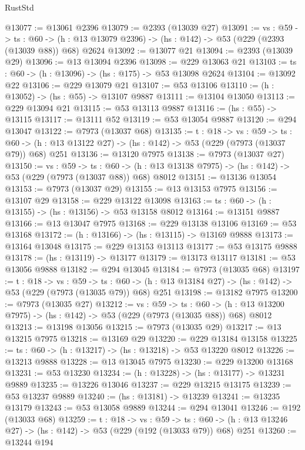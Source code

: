 \begin{lexlean}{RustStd}
\begin{coremodule}
@13077 := @13061 @2396
@13079 := @2393 (@13039 @27)
@13091 := {vs : @59} ->
  {ts : @60} -> (h : @13 @13079 @2396) -> (hs : @142) -> @53 (@229 (@2393 (@13039 @88)) @68) @2624
@13092 := @13077 @21
@13094 := @2393 (@13039 @29)
@13096 := @13 @13094 @2396
@13098 := @229 @13063 @21
@13103 := {ts : @60} -> (h : @13096) -> (hs : @175) -> @53 @13098 @2624
@13104 := @13092 @22
@13106 := @229 @13079 @21
@13107 := @53 @13106
@13110 := (h : @13052) -> (hs : @55) -> @13107 @9887
@13111 := @13104 @13050
@13113 := @229 @13094 @21
@13115 := @53 @13113 @9887
@13116 := (hs : @55) -> @13115
@13117 := @13111 @52
@13119 := @53 @13054 @9887
@13120 := @294 @13047
@13122 := @7973 (@13037 @68)
@13135 := {t : @18} ->
  {vs : @59} ->
  {ts : @60} -> (h : @13 @13122 @27) -> (hs : @142) -> @53 (@229 (@7973 (@13037 @79)) @68) @251
@13136 := @13120 @7975
@13138 := @7973 (@13037 @27)
@13150 := {vs : @59} ->
  {ts : @60} -> (h : @13 @13138 @7975) -> (hs : @142) -> @53 (@229 (@7973 (@13037 @88)) @68) @8012
@13151 := @13136 @13054
@13153 := @7973 (@13037 @29)
@13155 := @13 @13153 @7975
@13156 := @13107 @29
@13158 := @229 @13122 @13098
@13163 := {ts : @60} -> (h : @13155) -> (hs : @13156) -> @53 @13158 @8012
@13164 := @13151 @9887
@13166 := @13 @13047 @7975
@13168 := @229 @13138 @13106
@13169 := @53 @13168
@13172 := (h : @13166) -> (hs : @13115) -> @13169 @9888
@13173 := @13164 @13048
@13175 := @229 @13153 @13113
@13177 := @53 @13175 @9888
@13178 := (hs : @13119) -> @13177
@13179 := @13173 @13117
@13181 := @53 @13056 @9888
@13182 := @294 @13045
@13184 := @7973 (@13035 @68)
@13197 := {t : @18} ->
  {vs : @59} ->
  {ts : @60} -> (h : @13 @13184 @27) -> (hs : @142) -> @53 (@229 (@7973 (@13035 @79)) @68) @251
@13198 := @13182 @7975
@13200 := @7973 (@13035 @27)
@13212 := {vs : @59} ->
  {ts : @60} -> (h : @13 @13200 @7975) -> (hs : @142) -> @53 (@229 (@7973 (@13035 @88)) @68) @8012
@13213 := @13198 @13056
@13215 := @7973 (@13035 @29)
@13217 := @13 @13215 @7975
@13218 := @13169 @29
@13220 := @229 @13184 @13158
@13225 := {ts : @60} -> (h : @13217) -> (hs : @13218) -> @53 @13220 @8012
@13226 := @13213 @9888
@13228 := @13 @13045 @7975
@13230 := @229 @13200 @13168
@13231 := @53 @13230
@13234 := (h : @13228) -> (hs : @13177) -> @13231 @9889
@13235 := @13226 @13046
@13237 := @229 @13215 @13175
@13239 := @53 @13237 @9889
@13240 := (hs : @13181) -> @13239
@13241 := @13235 @13179
@13243 := @53 @13058 @9889
@13244 := @294 @13041
@13246 := @192 (@13033 @68)
@13259 := {t : @18} ->
  {vs : @59} ->
  {ts : @60} -> (h : @13 @13246 @27) -> (hs : @142) -> @53 (@229 (@192 (@13033 @79)) @68) @251
@13260 := @13244 @194

\end{coremodule}
\end{lexlean}
